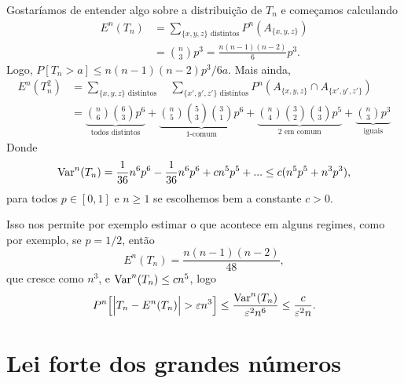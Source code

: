 \begin{topics}
Gostaríamos de entender algo sobre a distribuição de $T_n$ e começamos calculando
\begin{equation}
  \begin{split}
    E^n(T_n) & = \sum_{\{x,y,z\} \text{ distintos}} P^n(A_{\{x,y,z\}})\\
    & = \binom{n}{3} p^3 = \frac{n(n-1)(n-2)}{6}p^3.
  \end{split}
\end{equation}
Logo, $P[T_n > a] \leq n(n-1)(n-2)p^3/6a$.
Mais ainda,
\begin{equation}
  \begin{split}
    E^n(T_n^2) & = \sum_{\{x,y,z\} \text{ distintos}} \quad \sum_{\{x',y',z'\} \text{ distintos}} P^n(A_{\{x,y,z\}} \cap A_{\{x',y',z'\}})\\
    & = \underbrace{\binom{n}{6} \binom{6}{3} p^6}_{\text{todos distintos}} + \underbrace{\binom{n}{5} \binom{5}{3} \binom{3}{1} p^6}_{\text{$1$-comum}} + \underbrace{\binom{n}{4} \binom{3}{2} \binom{4}{3} p^5}_{\text{$2$ em comum}} + \underbrace{\binom{n}{3}p^3}_{\text{iguais}}
  \end{split}
\end{equation}
Donde
\begin{equation}
  \operatorname{Var}^n(T_n) = \frac{1}{36} n^6 p^6 - \frac{1}{36} n^6 p^6 + c n^5 p^5 + ... \leq c (n^5 p^5 + n^3 p^3),
\end{equation}
para todos $p \in [0,1]$ e $n \geq 1$ se escolhemos bem a constante $c > 0$.

Isso nos permite por exemplo estimar o que acontece em alguns regimes, como por exemplo, se $p = 1/2$, então
\begin{equation}
  E^n(T_n) = \frac{n(n-1)(n-2)}{48},
\end{equation}
que cresce como $n^3$, e $\operatorname{Var}^n(T_n) \leq c n^5$, logo
\begin{equation}
  P^n\Big[ \Big|T_n - E^n(T_n)\Big| > \varepsilon n^3 \Big] \leq \frac{\operatorname{Var}^n(T_n)}{\varepsilon^2 n^6} \leq \frac{c}{\varepsilon^2 n}.
\end{equation}

\end{topics}




\section{Lei forte dos grandes números}

